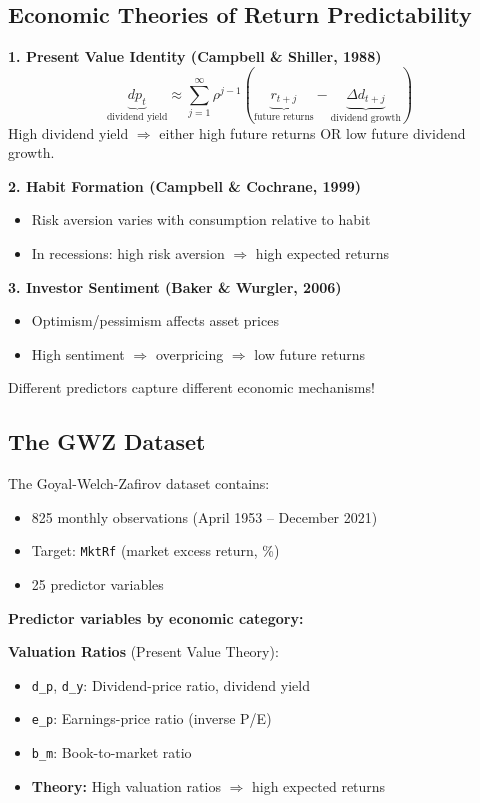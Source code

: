 \documentclass[11pt,a4paper]{article}
\begin{document}
\subsection{Economic Theories of Return Predictability}

\textbf{1. Present Value Identity (Campbell \& Shiller, 1988)}
\[
\underbrace{dp_t}_{\text{dividend yield}} \approx \sum_{j=1}^{\infty} \rho^{j-1} \left( \underbrace{r_{t+j}}_{\text{future returns}} - \underbrace{\Delta d_{t+j}}_{\text{dividend growth}} \right)
\]
High dividend yield $\Rightarrow$ either high future returns OR low future dividend growth.

\textbf{2. Habit Formation (Campbell \& Cochrane, 1999)}
\begin{itemize}
    \item Risk aversion varies with consumption relative to habit
    \item In recessions: high risk aversion $\Rightarrow$ high expected returns
\end{itemize}

\textbf{3. Investor Sentiment (Baker \& Wurgler, 2006)}
\begin{itemize}
    \item Optimism/pessimism affects asset prices
    \item High sentiment $\Rightarrow$ overpricing $\Rightarrow$ low future returns
\end{itemize}

Different predictors capture different economic mechanisms!

\subsection{The GWZ Dataset}

The Goyal-Welch-Zafirov dataset contains:
\begin{itemize}
    \item 825 monthly observations (April 1953 -- December 2021)
    \item Target: \texttt{MktRf} (market excess return, \%)
    \item 25 predictor variables
\end{itemize}

\textbf{Predictor variables by economic category:}

\textbf{Valuation Ratios} (Present Value Theory):
\begin{itemize}
    \item \texttt{d\_p}, \texttt{d\_y}: Dividend-price ratio, dividend yield
    \item \texttt{e\_p}: Earnings-price ratio (inverse P/E)
    \item \texttt{b\_m}: Book-to-market ratio
    \item \textbf{Theory:} High valuation ratios $\Rightarrow$ high expected returns
\end{itemize}
\end{document}
